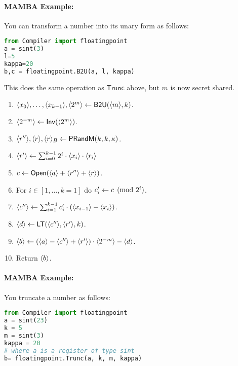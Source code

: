 \paragraph{MAMBA Example:} You can transform a number into its unary form as follows: 
\begin{lstlisting}[language={python}]
from Compiler import floatingpoint
a = sint(3)
l=5
kappa=20
b,c = floatingpoint.B2U(a, l, kappa)
\end{lstlisting}


This does the same operation as $\mathsf{Trunc}$ above, but $m$ is now secret shared.
\begin{enumerate}
\item $\langle x_0 \rangle,\ldots,\langle x_{k-1} \rangle, \langle 2^m \rangle \leftarrow \mathsf{B2U}(\langle m \rangle,k)$.
\item $\langle 2^{-m} \rangle \leftarrow \mathsf{Inv}(\langle 2^m \rangle)$.
\item $\langle r'' \rangle, \langle r \rangle, \langle r \rangle_B \leftarrow \mathsf{PRandM}(k,k,\kappa)$.
\item $\langle r' \rangle \leftarrow \sum_{i=0}^{k-1} 2^i \cdot \langle x_i \rangle \cdot \langle r_i \rangle$
\item $c \leftarrow {\mathsf{Open}}(\langle a \rangle+\langle r'' \rangle+\langle r \rangle)$.
\item For $i \in [1,\ldots,k=1]$ do $c_i' \leftarrow c \pmod{2^i}$.
\item $\langle c'' \rangle \leftarrow \sum_{i=1}^{k-1} c_i' \cdot (\langle x_{i-1} \rangle-\langle x_i \rangle)$.
\item $\langle d \rangle \leftarrow \mathsf{LT}(\langle c'' \rangle,\langle r' \rangle,k)$.
\item $\langle b \rangle \leftarrow (\langle a \rangle-\langle c'' \rangle+\langle r' \rangle) \cdot \langle 2^{-m} \rangle - \langle d \rangle$.
\item Return $\langle b \rangle$.
\end{enumerate}

\paragraph{MAMBA Example:} You truncate a number as follows: 
\begin{lstlisting}[language={python}]
from Compiler import floatingpoint
a = sint(23)
k = 5
m = sint(3)
kappa = 20
# where a is a register of type sint
b= floatingpoint.Trunc(a, k, m, kappa)
\end{lstlisting}


